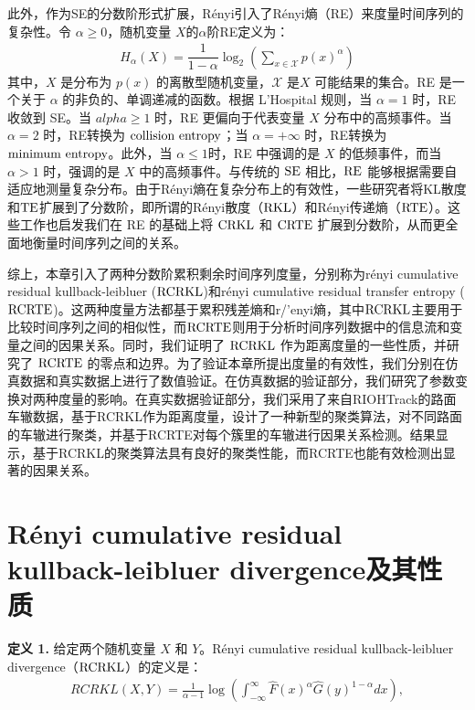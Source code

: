 此外，作为SE的分数阶形式扩展，R{\'e}nyi引入了R{\'e}nyi熵（RE）来度量时间序列的复杂性\cite{21}。令 $\alpha \geq 0$，随机变量 $X$的$\alpha$阶RE定义为：
\begin{align}\label{RE}
H_{\alpha}(X) = \dfrac{1}{1 - \alpha} \log_2 \left(\sum_{x \in \mathcal{X}} p(x)^{\alpha} \right)
\end{align}
其中，$X$ 是分布为 $p(x)$ 的离散型随机变量，$\mathcal{X}$ 是$X$ 可能结果的集合。RE 是一个关于 $\alpha$ 的非负的、单调递减的函数\cite{22}。根据 L'Hospital 规则，当 $\alpha=1$ 时，RE 收敛到 SE。当 $alpha \geq 1$ 时，RE 更偏向于代表变量 $X$ 分布中的高频事件。当 $\alpha=2$ 时，RE转换为 $\rm{collision\ entropy}$；当 $\alpha=+\infty$ 时，RE转换为 $\rm{minimum\ entropy}$。此外，当 $\alpha \leq 1$时，RE 中强调的是 $X$ 的低频事件，而当 $\alpha > 1$ 时，强调的是 $X$ 中的高频事件\cite{23}。与传统的 $\rm{SE}$ 相比，$\rm{RE}$ 能够根据需要自适应地测量复杂分布。由于R\'{e}nyi熵在复杂分布上的有效性，一些研究者将KL散度和$\rm{TE}$扩展到了分数阶\cite{24,25}，即所谓的R\'{e}nyi散度（$\rm{RKL}$）和R\'{e}nyi传递熵（$\rm{RTE}$）。这些工作也启发我们在 RE 的基础上将 $\rm{CRKL}$ 和 $\rm{CRTE}$ 扩展到分数阶，从而更全面地衡量时间序列之间的关系。

综上，本章引入了两种分数阶累积剩余时间序列度量，分别称为r\'{e}nyi cumulative residual kullback-leibluer ($\rm{RCRKL}$)和r\'{e}nyi cumulative residual transfer entropy ($\rm{RCRTE}$)。这两种度量方法都基于累积残差熵和r/'{e}nyi熵，其中$\rm{RCRKL}$主要用于比较时间序列之间的相似性，而$\rm{RCRTE}$则用于分析时间序列数据中的信息流和变量之间的因果关系。同时，我们证明了 $\rm{RCRKL}$ 作为距离度量的一些性质，并研究了 $\rm{RCRTE}$ 的零点和边界。为了验证本章所提出度量的有效性，我们分别在仿真数据和真实数据上进行了数值验证。在仿真数据的验证部分，我们研究了参数变换对两种度量的影响。在真实数据验证部分，我们采用了来自RIOHTrack的路面车辙数据，基于RCRKL作为距离度量，设计了一种新型的聚类算法，对不同路面的车辙进行聚类，并基于RCRTE对每个簇里的车辙进行因果关系检测。结果显示，基于RCRKL的聚类算法具有良好的聚类性能，而RCRTE也能有效检测出显著的因果关系。

\section{R\'{e}nyi cumulative residual kullback-leibluer divergence及其性质}

\textbf{定义 1.} 给定两个随机变量 $X$ 和 $Y$。R\'{e}nyi cumulative residual kullback-leibluer divergence（$\rm{RCRKL}$）的定义是：
\begin{align}
RCRKL(X,Y)=\frac{1}{\alpha-1} \log \left( \int_{-\infty}^{\infty} \hat F(x)^{\alpha} \hat G(y)^{1-\alpha} dx \right),
\end{align}

